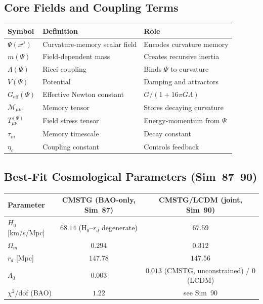 \documentclass[12pt,a4paper]{article}
\begin{document}
\subsection{Core Fields and Coupling Terms}

\begin{center}
\begin{tabular}{lll}
\toprule
Symbol & Definition & Role \\
\midrule
$\Psi(x^\mu)$ & Curvature-memory scalar field & Encodes curvature memory \\
$m(\Psi)$ & Field-dependent mass & Creates recursive inertia \\
$\Lambda(\Psi)$ & Ricci coupling & Binds $\Psi$ to curvature \\
$V(\Psi)$ & Potential & Damping and attractors \\
$G_{\mathrm{eff}}(\Psi)$ & Effective Newton constant & $G/(1+16\pi G\Lambda)$ \\
$\mathcal{M}_{\mu\nu}$ & Memory tensor & Stores decaying curvature \\
$T^{(\Psi)}_{\mu\nu}$ & Field stress tensor & Energy-momentum from $\Psi$ \\
$\tau_m$ & Memory timescale & Decay constant \\
$\eta_c$ & Coupling constant & Controls feedback \\
\bottomrule
\end{tabular}
\end{center}

\subsection{Best-Fit Cosmological Parameters (Sim~87--90)}

\begin{center}
\begin{tabular}{lcc}
\toprule
Parameter & CMSTG (BAO-only, Sim~87) & CMSTG/LCDM (joint, Sim~90) \\
\midrule
$H_0$ [km/s/Mpc] & $68.14$ (H$_0$--$r_d$ degenerate) & $67.59$ \\
$\Omega_m$ & $0.294$ & $0.312$ \\
$r_d$ [Mpc] & $147.78$ & $147.56$ \\
$\Lambda_0$ & $0.003$ & $0.013$ (CMSTG, unconstrained) / 0 (LCDM) \\
$\chi^2$/dof (BAO) & $1.22$ & see Sim~90 \\
\bottomrule
\end{tabular}
\end{center}
\end{document}
